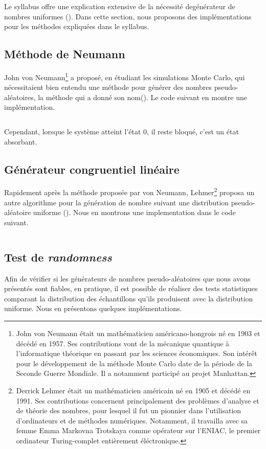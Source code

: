         Le syllabus offre une explication extensive de la nécessité degénérateur de nombres uniformes (\cite{infof305}). Dans cette section, nous proposons des implémentations pour les méthodes expliquées dans le syllabus.
        \subsection{Méthode de Neumann}
            John von Neumann\footnote{John von Neumann était un mathématicien américano-hongrois né en 1903 et décédé en 1957. Ses contributions vont de la mécanique quantique à l'informatique théorique en passant par les sciences économiques. Son intérêt pour le développement de la méthode Monte Carlo date de la période de la Seconde Guerre Mondiale. Il a notamment participé au projet Manhattan.} a proposé, en étudiant les simulations Monte Carlo, qui nécessitaient bien entendu une méthode pour générer des nombres pseudo-aléatoires, la méthode qui a donné son nom(\cite{von195113}). Le code suivant en montre une implémentation.
            \inputminted{python}{codes/von_neumann.py}
            Cependant, lorsque le système atteint l'état $0$, il reste bloqué, c'est un état absorbant. 
            
        \subsection{Générateur congruentiel linéaire}
            Rapidement après la méthode proposée par von Neumann, Lehmer\footnote{Derrick Lehmer était un mathématicien américain né en 1905 et décédé en 1991. Ses contributions concernent principalement des problèmes d'analyse et de théorie des nombres, pour lesquel il fut un pionnier dans l'utilisation d'ordinateurs et de méthodes numériques. Notamment, il travailla avec sa femme Emma Markovna Trotskaya comme opérateur sur l'ENIAC, le premier ordinateur Turing-complet entièrement éléctronique.} proposa un autre algorithme pour la génération de nombre suivant une distribution pseudo-aléatoire uniforme (\cite{lehmer1951}). Nous en montrons une implementation dans le code suivant.
            \inputminted{python}{codes/LGC.py}
            
        \subsection{Test de \textit{randomness}}
            Afin de vérifier si les générateurs de nombres pseudo-aléatoires que nous avons présentés sont fiables, en pratique, il est possible de réaliser des tests statistiques comparant la distribution des échantillons qu'ils produisent avec la distribution uniforme. Nous en présentons quelques implémentations.
